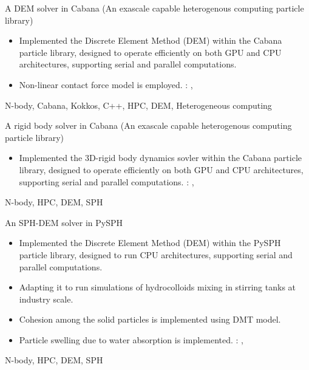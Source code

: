 %
%


\begin{experiences}
  \experience
  {} {A DEM solver in Cabana (An exascale capable heterogenous computing particle library)}{}{}
  {}    {
    \begin{itemize}
    \item Implemented the Discrete Element Method (DEM) within the Cabana
      particle library, designed to operate efficiently on both GPU and CPU
      architectures, supporting serial and parallel computations.
    \item Non-linear contact force model is employed.
      \faGithub: ,
    \end{itemize}
  }
  {N-body, Cabana, Kokkos, C++, HPC, DEM, Heterogeneous computing}

  \emptySeparator
  \experience
  {} {A rigid body solver in Cabana (An exascale capable heterogenous computing particle library)}{}{}
  {}    {
    \begin{itemize}
    \item Implemented the 3D-rigid body dynamics sovler within the Cabana
      particle library, designed to operate efficiently on both GPU and CPU
      architectures, supporting serial and parallel computations.
      \faGithub: ,
    \end{itemize}
  }
  {N-body, HPC, DEM, SPH}

  \emptySeparator
  \experience
  {} {An SPH-DEM solver in PySPH}{}{}
  {}    {
    \begin{itemize}
    \item Implemented the Discrete Element Method (DEM) within the PySPH
      particle library, designed to run CPU architectures, supporting serial and
      parallel computations.
    \item Adapting it to run simulations of hydrocolloids mixing in stirring
      tanks at industry scale.
    \item Cohesion among the solid particles is implemented using DMT model.
    \item Particle swelling due to water absorption is implemented.
      \faGithub: ,
    \end{itemize}
  }
  {N-body, HPC, DEM, SPH}


\end{experiences}
